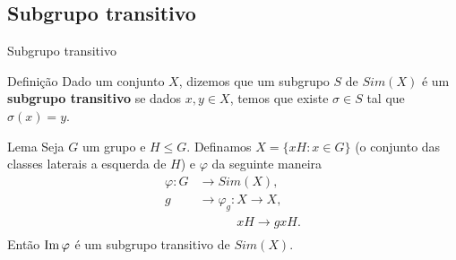 \subsection{Subgrupo transitivo}
\begin{frame}{Subgrupo transitivo}
  \begin{block}{Definição}
    Dado um conjunto $X$, dizemos que um subgrupo $S$ de $Sim(X)$ é um \textbf{subgrupo transitivo} se dados $x,y\in X$, temos que existe $\sigma\in S$ tal que $\sigma(x)=y$. 
  \end{block}
  \begin{block}{Lema}
    Seja $G$ um grupo e $H\leq G$. Definamos $X=\{xH:x\in G\}$ (o conjunto das classes laterais a esquerda de $H$) e $\varphi$ da seguinte maneira
    \begin{align*}
      \varphi:G&\to Sim(X),\\
              g&\to \varphi_g:X\to X,\\
    \phantom{g}&\phantom{\to \varphi_g:}xH\to gxH.
    \end{align*}
    Então $\operatorname{Im} \varphi$ é um subgrupo transitivo de $Sim(X)$.
  \end{block}
\end{frame}

